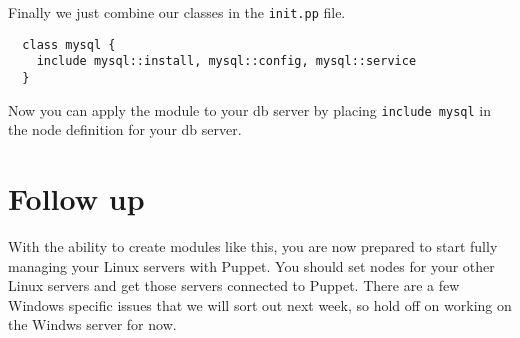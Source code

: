 \documentclass{article}   	%
\begin{document}
Finally we just combine our classes in the \texttt{init.pp} file.

\begin{verbatim}
  class mysql {
    include mysql::install, mysql::config, mysql::service
  }
\end{verbatim}

Now you can apply the module to your db server by placing \texttt{include mysql} in the node definition for your db server.

\section{Follow up}
With the ability to create modules like this, you are now prepared to start fully managing your Linux servers with Puppet.  You should set nodes for your other Linux servers and get those servers connected to Puppet. There are a few Windows specific issues that we will sort out next week, so hold off on working on the Windws server for now.
\end{document}
